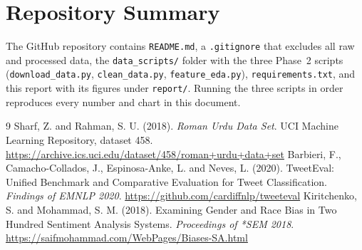 \documentclass[11pt,a4paper]{article}
\begin{document}
\section{Repository Summary}
The GitHub repository contains \texttt{README.md}, a \texttt{.gitignore} that excludes all raw
and processed data, the \texttt{data\_scripts/} folder with the three Phase~2 scripts
(\texttt{download\_data.py}, \texttt{clean\_data.py}, \texttt{feature\_eda.py}),
\texttt{requirements.txt}, and this report with its figures under \texttt{report/}.
Running the three scripts in order reproduces every number and chart in this document.

\begin{thebibliography}{9}
 Sharf, Z. and Rahman, S. U. (2018). \emph{Roman Urdu Data Set}. UCI Machine
  Learning Repository, dataset 458. \url{https://archive.ics.uci.edu/dataset/458/roman+urdu+data+set}
 Barbieri, F., Camacho-Collados, J., Espinosa-Anke, L. and Neves, L. (2020).
  TweetEval: Unified Benchmark and Comparative Evaluation for Tweet Classification.
  \emph{Findings of EMNLP 2020}. \url{https://github.com/cardiffnlp/tweeteval}
 Kiritchenko, S. and Mohammad, S. M. (2018). Examining Gender and Race Bias in Two
  Hundred Sentiment Analysis Systems. \emph{Proceedings of *SEM 2018}.
  \url{https://saifmohammad.com/WebPages/Biases-SA.html}
\end{thebibliography}
\end{document}
